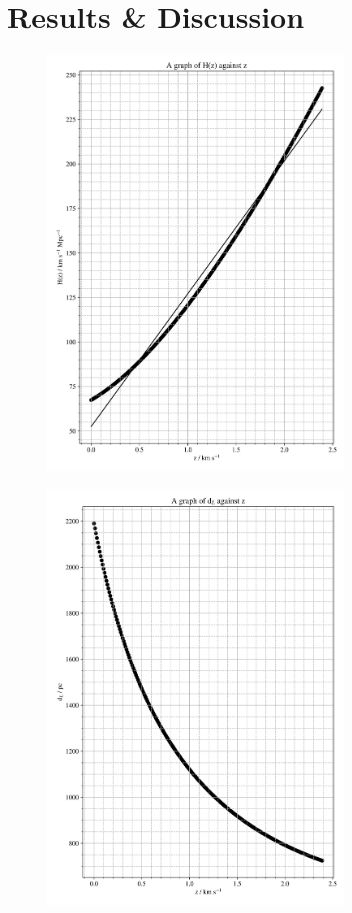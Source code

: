 \documentclass[12pt, a4paper]{article}
\begin{document}
\section{Results \& Discussion}
\begin{figure}[]
    \centering
    \includegraphics[width = 0.7\textwidth]{Graph 1.png}
\end{figure}

\begin{figure}[]
    \centering
    \includegraphics[width = 0.7\textwidth]{Graph 2.png}
\end{figure}
\end{document}
